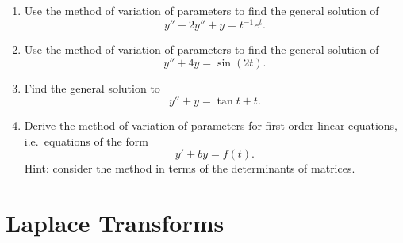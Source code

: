 \documentclass[12pt]{book}
\begin{document}
\begin{enumerate}

\item Use the method of variation of parameters to find the general solution of
  \begin{dmath*}
  y'' - 2 y'' + y = t^{-1} e^t.
  \end{dmath*}

\item Use the method of variation of parameters to find the general solution of
  \begin{dmath*}
  y'' + 4y = \sin(2t).
  \end{dmath*}

\item
  Find the general solution to
  \begin{dmath*}
  y'' + y = \tan t + t.
  \end{dmath*}

\item
  Derive the method of variation of parameters for first-order linear
  equations, i.e.\ equations of the form
  \begin{dmath*}
  y' + by = f(t).
  \end{dmath*}
  Hint: consider the method in terms of the determinants of matrices.

\end{enumerate}


\chapter{Laplace Transforms}
\end{document}
